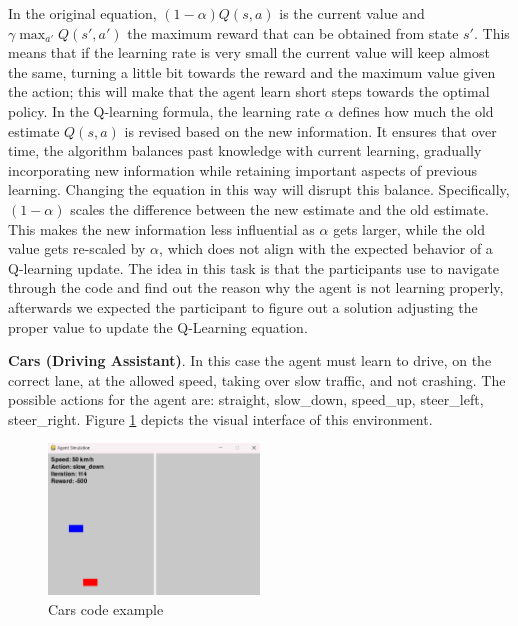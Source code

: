 In the original equation,  $(1-\alpha) Q(s, a)$ is the current value and $\gamma \max_{a'} Q(s', a')$ 
the maximum reward that can be obtained from state $s'$. This means that if the learning rate is very 
small the current value will keep almost the same, turning a little bit towards the reward and the 
maximum value given the action; this will make that the agent learn short steps towards the 
optimal policy. In the Q-learning formula, the learning rate $\alpha$ defines how much the old estimate $Q(s,a)$ 
is revised based on the new information. It ensures that over time, the algorithm balances past 
knowledge with current learning, gradually incorporating new information while retaining important 
aspects of previous learning. Changing the equation in this way will disrupt this balance. Specifically,
$(1-\alpha)$ scales the difference between the new estimate and the old estimate. This makes the new information less influential as $\alpha$ gets larger, while the old value gets re-scaled by $\alpha$,  which does not align with the expected behavior of a Q-learning update. The idea in this task is that the participants use \flik to navigate through the code and find out the reason why the agent is not learning properly, afterwards we expected the participant to figure out a solution adjusting the proper value to update the Q-Learning equation.

\textbf{Cars (Driving Assistant)}. In this case the agent must learn to drive, on the correct lane, at the allowed speed, taking over slow traffic, and not crashing. The possible actions for the agent are: straight, slow\_down, speed\_up, steer\_left, steer\_right. Figure \ref{fig:cars-code-example} depicts the visual interface of this environment.

\begin{figure}[h]
    \centering
    \includegraphics[width=0.5\textwidth]{figures/cars_example.png}
    \caption{Cars code example}
    \label{fig:cars-code-example}
\end{figure}

